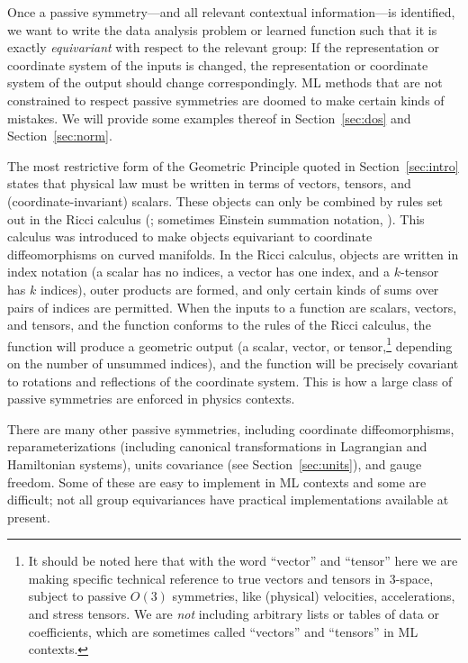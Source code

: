 \documentclass[preprint]{article} %
\newcommand{\sectionname}{Section}
\newcommand{\secref}[1]{\sectionname~\ref{#1}}
\begin{document}
Once a passive symmetry---and all relevant contextual information---is identified, we want to write the data analysis problem or learned function such that it is exactly \emph{equivariant} with respect to the relevant group:
If the representation or coordinate system of the inputs is changed, the representation or coordinate system of the output should change correspondingly.
ML methods that are not constrained to respect passive symmetries are doomed to make certain kinds of mistakes.
We will provide some examples thereof in \secref{sec:dos} and \secref{sec:norm}.

The most restrictive form of the Geometric Principle quoted in \secref{sec:intro} states that physical law must be written in terms of vectors, tensors, and (coordinate-invariant) scalars.
These objects can only be combined by rules set out in the Ricci calculus (\citealt{ricci}; sometimes Einstein summation notation, \citealt{einstein}).
This calculus was introduced to make objects equivariant to coordinate diffeomorphisms on curved manifolds.
In the Ricci calculus, objects are written in index notation (a scalar has no indices, a vector has one index, and a $k$-tensor has $k$ indices), outer products are formed, and only certain kinds of sums over pairs of indices are permitted.
When the inputs to a function are scalars, vectors, and tensors, and the function conforms to the rules of the Ricci calculus, the function will produce a geometric output (a scalar, vector, or tensor,\footnote{%
It should be noted here that with the word ``vector'' and ``tensor'' here we are making specific technical reference to true vectors and tensors in 3-space, subject to passive $O(3)$ symmetries, like (physical) velocities, accelerations, and stress tensors.
We are \emph{not} including arbitrary lists or tables of data or coefficients, which are sometimes called ``vectors'' and ``tensors'' in ML contexts.} depending on the number of unsummed indices), and the function will be precisely covariant to rotations and reflections of the coordinate system.
This is how a large class of passive symmetries are enforced in physics contexts.

There are many other passive symmetries, including coordinate diffeomorphisms, reparameterizations (including canonical transformations in Lagrangian and Hamiltonian systems), units covariance (see \secref{sec:units}), and gauge freedom.
Some of these are easy to implement in ML contexts and some are difficult;
not all group equivariances have practical implementations available at present.
\end{document}
